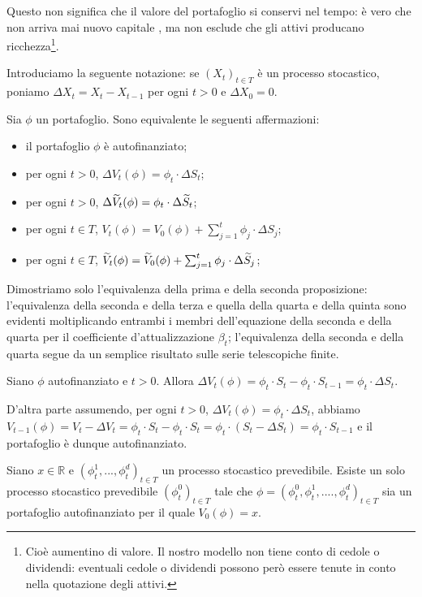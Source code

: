 \par Questo non significa che il valore del portafoglio si conservi nel tempo: \`e vero che non arriva mai nuovo capitale , ma non esclude che gli attivi producano ricchezza\footnote{Cio\`e aumentino di valore. Il nostro modello non tiene conto di cedole o dividendi: eventuali cedole o dividendi possono per\`o essere tenute in conto nella quotazione degli attivi.}.
\par Introduciamo la seguente notazione: se $(X_t)_{t \in T}$ \`e un processo stocastico, poniamo $\Delta X_t = X_t - X_{t - 1}$ per ogni $t > 0$ e $\Delta X_0 = 0$.
\begin{Lemma}\label{LemmaAutofinanziato}
	Sia $\phi$ un portafoglio. Sono equivalente le seguenti affermazioni:
	\begin{itemize}
		\item il portafoglio $\phi$ \`e autofinanziato;
		\item per ogni $t > 0$, $\Delta V_t(\phi) = \phi_t \cdot \Delta S_t$;
		\item per ogni $t > 0$, $\Delta \widetilde{V}_t(\phi) = \phi_t \cdot \Delta \widetilde{S}_t$;
		\item per ogni $t \in T$, $V_t(\phi) = V_0(\phi) + \sum_{j = 1}^t \phi_j \cdot \Delta S_j$;
		\item per ogni $t \in T$, $\widetilde{V}_t(\phi) = \widetilde{V}_0(\phi) + \sum_{j = 1}^t \phi_j \cdot \Delta \widetilde{S}_j$;
	\end{itemize}
\end{Lemma}
\Proof Dimostriamo solo l'equivalenza della prima e della seconda proposizione: l'equivalenza della seconda e della terza e quella della quarta e della quinta sono evidenti moltiplicando entrambi i membri dell'equazione della seconda e della quarta per il coefficiente d'attualizzazione $\beta_t$; l'equivalenza della seconda e della quarta segue da un semplice risultato sulle serie telescopiche finite.
\par Siano $\phi$ autofinanziato e $t > 0$. Allora $\Delta V_t(\phi) = \phi_t \cdot S_t - \phi_t \cdot S_{t -1} = \phi_t \cdot \Delta S_t$.
\par D'altra parte assumendo, per ogni $t > 0$, $\Delta V_t(\phi) = \phi_t \cdot \Delta S_t$, abbiamo $V_{t - 1}(\phi) = V_t - \Delta V_t = \phi_t \cdot S_t - \phi_t \cdot S_t = \phi_t \cdot (S_t - \Delta S_t) = \phi_t \cdot S_{t - 1}$ e il portafoglio \`e dunque autofinanziato. \EndProof
\begin{Theorem}\label{TeoremaEstensioneSenzaRischio}
	Siano $x \in \mathbb{R}$ e $(\phi^1_t,...,\phi^d_t)_{t \in T}$ un processo stocastico prevedibile. Esiste un solo processo stocastico prevedibile $(\phi^0_t)_{t \in T}$ tale che $\phi = (\phi^0_t, \phi^1_t, ...., \phi^d_t)_{t \in T}$ sia un portafoglio autofinanziato per il quale $V_0(\phi) = x$.
\end{Theorem}
